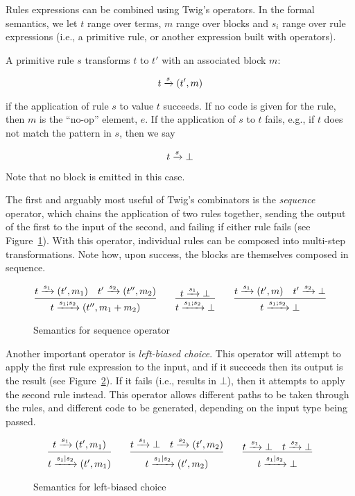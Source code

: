 Rules expressions can be combined using Twig's operators. In the formal semantics, we let $t$ range over terms, $m$ range over blocks and $s_i$ range over rule expressions (i.e., a primitive rule, or another expression built with operators).

A primitive rule $s$ transforms $t$ to $t'$ with an associated  block $m$:

\[
t \xrightarrow{s} (t',m)
\]

if the application of rule $s$ to value $t$ succeeds. If no code is given for the rule, then $m$ is the ``no-op'' element, $e$. If the application of $s$ to $t$ fails, e.g., if $t$ does not match the pattern in $s$, then we say

\[
t \xrightarrow{s} \bot
\]

Note that no block is emitted in this case.

The first and arguably most useful of Twig's combinators is the \emph{sequence} operator, which chains the application of two rules together, sending the output of the first to the input of the second, and failing if either rule fails (see Figure~\ref{fig:seq}). With this operator, individual rules can be composed into multi-step transformations. Note how, upon success, the blocks are themselves composed in sequence.

\begin{figure}[ht]
\label{fig:seq}
\[
\infer
  {t \arr{s_1;s_2} (t'',m_1+m_2)}
  {t \arr{s_1} (t',m_1) \quad t' \arr{s_2} (t'',m_2)}
\qquad
\infer
  {t \arr{s_1;s_2} \bot}
  {t \arr{s_1} \bot}
\qquad
\infer
  {t \arr{s_1;s_2} \bot}
  {t \arr{s_1} (t',m) \quad t' \arr{s_2} \bot}
\]
\caption{Semantics for sequence operator}
\end{figure}

Another important operator is \emph{left-biased choice}. This operator will attempt to apply the first rule expression to the input, and if it succeeds then its output is the result (see Figure~\ref{fig:choice}). If it fails (i.e., results in $\bot$), then it attempts to apply the second rule instead. This operator allows different paths to be taken through the rules, and different code to be generated, depending on the input type being passed.

\begin{figure}[ht]
\label{fig:choice}
\[
\infer
  {t \arr{s_1|s_2} (t',m_1)}
  {t \arr{s_1} (t',m_1)}
\qquad 
\infer
  {t \arr{s_1|s_2} (t',m_2)}
  {t \arr{s_1} \bot \quad t \arr{s_2} (t',m_2)}
\qquad
\infer
  {t \arr{s_1|s_2} \bot}
  {t \arr{s_1} \bot \quad t \arr{s_2} \bot}
\]
\caption{Semantics for left-biased choice}
\end{figure}

